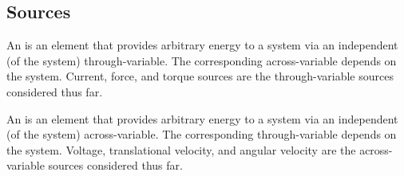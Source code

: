 \documentclass[dynamic_systems.tex]{subfiles}
\begin{document}
\subsection{Sources}

An  is an element that provides arbitrary energy to a system via an independent (of the system) through-variable.
The corresponding across-variable depends on the system.
Current, force, and torque sources are the through-variable sources considered thus far.

An  is an element that provides arbitrary energy to a system via an independent (of the system) across-variable.
The corresponding through-variable depends on the system.
Voltage, translational velocity, and angular velocity are the across-variable sources considered thus far.
\end{document}
